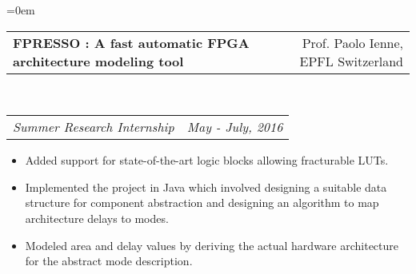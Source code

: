 \documentclass{article}
\makeatletter
\newenvironment{longversion}{}{} %
\newcommand{\headerrow}[2]
{\begin{tabular*}{\linewidth}{l@{\extracolsep{\fill}}r}
	#1 &
	#2 \\
\end{tabular*}}
\makeatother
\begin{document}
\begin{list} {}{\leftmargin=0em}
\item[]
  \headerrow
    {\textbf{FPRESSO : A fast automatic FPGA architecture modeling tool}}
    {Prof. Paolo Ienne, EPFL Switzerland}
  \\
  \headerrow
    {\emph{Summer Research Internship}}
    {\emph{May - July, 2016}}
      \begin{itemize}
        \item Added support for state-of-the-art logic blocks allowing fracturable LUTs.
        \item Implemented the project in Java which involved designing a suitable data structure for component
abstraction and designing an algorithm to map architecture delays to modes.
        \item Modeled area and delay values by deriving the actual hardware architecture for the abstract mode
description.
      \end{itemize}

\end{list}

\begin{longversion}
\end{longversion}
\end{document}

